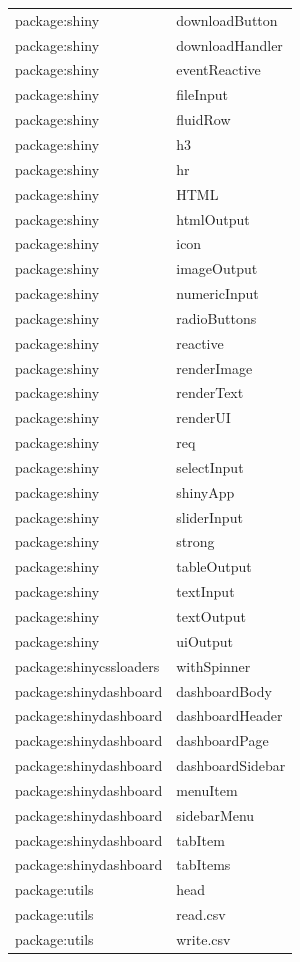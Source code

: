 \documentclass[]{article}
\begin{document}
\begin{longtable}{ll}
\rowcolor{gray!6} package:shiny & downloadButton\\
package:shiny & downloadHandler\\
\rowcolor{gray!6} package:shiny & eventReactive\\
package:shiny & fileInput\\
\rowcolor{gray!6} package:shiny & fluidRow\\
package:shiny & h3\\
\rowcolor{gray!6} package:shiny & hr\\
package:shiny & HTML\\
\rowcolor{gray!6} package:shiny & htmlOutput\\
package:shiny & icon\\
\rowcolor{gray!6} package:shiny & imageOutput\\
package:shiny & numericInput\\
\rowcolor{gray!6} package:shiny & radioButtons\\
package:shiny & reactive\\
\rowcolor{gray!6} package:shiny & renderImage\\
package:shiny & renderText\\
\rowcolor{gray!6} package:shiny & renderUI\\
package:shiny & req\\
\rowcolor{gray!6} package:shiny & selectInput\\
package:shiny & shinyApp\\
\rowcolor{gray!6} package:shiny & sliderInput\\
package:shiny & strong\\
\rowcolor{gray!6} package:shiny & tableOutput\\
package:shiny & textInput\\
\rowcolor{gray!6} package:shiny & textOutput\\
package:shiny & uiOutput\\
\rowcolor{gray!6} package:shinycssloaders & withSpinner\\
package:shinydashboard & dashboardBody\\
\rowcolor{gray!6} package:shinydashboard & dashboardHeader\\
package:shinydashboard & dashboardPage\\
\rowcolor{gray!6} package:shinydashboard & dashboardSidebar\\
package:shinydashboard & menuItem\\
\rowcolor{gray!6} package:shinydashboard & sidebarMenu\\
package:shinydashboard & tabItem\\
\rowcolor{gray!6} package:shinydashboard & tabItems\\
package:utils & head\\
\rowcolor{gray!6} package:utils & read.csv\\
package:utils & write.csv\\
\bottomrule
\end{longtable}
\endgroup{}
\end{document}
